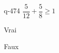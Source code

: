 \begin{truefalse}{q-474}
$\dfrac{5}{12} + \dfrac{5}{8} \geq 1$
\item* Vrai
\item Faux
\end{truefalse}

